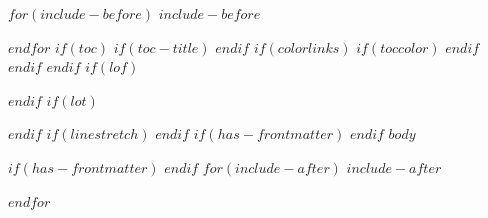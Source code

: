 \documentclass[
$for(babel-otherlangs)$
  $babel-otherlangs$,
$endfor$
$if(babel-lang)$
  $babel-lang$,
$endif$
$if(fontsize)$
  $fontsize$,
$endif$
$if(papersize)$
  $papersize$paper,
$endif$
$for(classoption)$
  $classoption$$sep$,
$endfor$
]{$documentclass$}
\begin{document}
\newpage

\pagestyle{plain}

$for(include-before)$
$include-before$

$endfor$
$if(toc)$
$if(toc-title)$
\renewcommand*\contentsname{$toc-title$}
$endif$
{
$if(colorlinks)$
$if(toccolor)$
\hypersetup{linkcolor=$toccolor$}
$endif$
$endif$
\setcounter{tocdepth}{$toc-depth$}
\tableofcontents
}
$endif$
$if(lof)$
\listoffigures
\newpage
$endif$
$if(lot)$
\listoftables
\newpage
$endif$
$if(linestretch)$
$endif$
$if(has-frontmatter)$
\mainmatter
$endif$
$body$

$if(has-frontmatter)$
\backmatter
$endif$
$for(include-after)$
$include-after$

$endfor$
\end{document}
